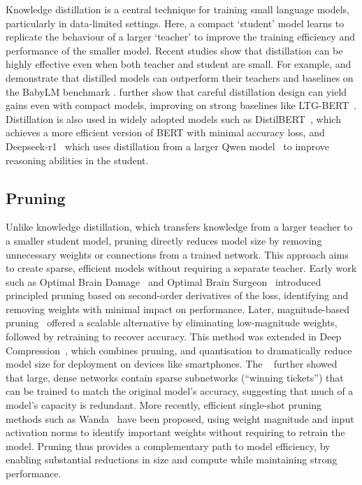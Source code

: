 Knowledge distillation is a central technique for training small language models, particularly in data-limited settings. Here, a compact `student' model learns to replicate the behaviour of a larger `teacher' to improve the training efficiency and performance of the smaller model.
Recent studies show that distillation can be highly effective even when both teacher and student are small. For example, \citet{timiryasov2023baby} and \citet{tastet2024babyllama2} demonstrate that distilled models can outperform their teachers and baselines on the BabyLM benchmark \citep{warstadt2023babylm1, conll2024babylm2}. \citet{yam2024tinyminds} further show that careful distillation design can yield gains even with compact models, improving on strong baselines like LTG-BERT~\citep{samuel2023ltgbert}.
Distillation is also used in widely adopted models such as DistilBERT~\citep{sanh2019distilbert}, which achieves a more efficient version of BERT with minimal accuracy loss, and Deepseek-r1~\citep{guo2025deepseekr1} which uses distillation from a larger Qwen model~\citep{alibaba2023qwen} to improve reasoning abilities in the student.

\subsection{Pruning}

Unlike knowledge distillation, which transfers knowledge from a larger teacher to a smaller student model, pruning directly reduces model size by removing unnecessary weights or connections from a trained network. This approach aims to create sparse, efficient models without requiring a separate teacher.
Early work such as Optimal Brain Damage~\citep{lecun1990optimal} and Optimal Brain Surgeon~\citep{hassibi1993optimal} introduced principled pruning based on second-order derivatives of the loss, identifying and removing weights with minimal impact on performance. Later, magnitude-based pruning~\citep{han2015learning} offered a scalable alternative by eliminating low-magnitude weights, followed by retraining to recover accuracy. This method was extended in Deep Compression~\citep{han2016deep}, which combines pruning, and quantisation to dramatically reduce model size for deployment on devices like smartphones.
The ~\citep{frankle2019lottery} further showed that large, dense networks contain sparse subnetworks (“winning tickets”) that can be trained to match the original model's accuracy, suggesting that much of a model's capacity is redundant. More recently, efficient single-shot pruning methods such as Wanda~\citep{sun2024simple} have been proposed, using weight magnitude and input activation norms to identify important weights without requiring to retrain the model. Pruning thus provides a complementary path to model efficiency, by enabling substantial reductions in size and compute while maintaining strong performance.

